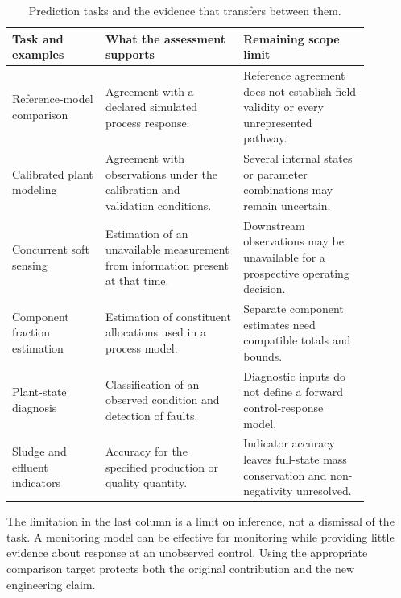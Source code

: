 \begin{table}[htbp]
\centering\footnotesize
\caption{Prediction tasks and the evidence that transfers between them.}
\label{tab:rrl_prediction_evidence}
\begin{tabular}{>{\raggedright\arraybackslash}p{0.23\linewidth}>{\raggedright\arraybackslash}p{0.34\linewidth}>{\raggedright\arraybackslash}p{0.31\linewidth}}
\toprule Task and examples & What the assessment supports & Remaining scope limit\\\midrule
Reference-model comparison\newline\citep{Calise2020,Henze2006} & Agreement with a declared simulated process response. & Reference agreement does not establish field validity or every unrepresented pathway.\\
Calibrated plant modeling\newline\citep{Meijer2004,SadriMoghaddam2021} & Agreement with observations under the calibration and validation conditions. & Several internal states or parameter combinations may remain uncertain.\\
Concurrent soft sensing\newline\citep{Ching2022} & Estimation of an unavailable measurement from information present at that time. & Downstream observations may be unavailable for a prospective operating decision.\\
Component fraction estimation\newline\citep{Wang2024} & Estimation of constituent allocations used in a process model. & Separate component estimates need compatible totals and bounds.\\
Plant-state diagnosis\newline\citep{Poch1993} & Classification of an observed condition and detection of faults. & Diagnostic inputs do not define a forward control-response model.\\
Sludge and effluent indicators\newline\citep{Ekinci2023,ManavDemir2024} & Accuracy for the specified production or quality quantity. & Indicator accuracy leaves full-state mass conservation and non-negativity unresolved.\\
\bottomrule
\end{tabular}
\end{table}

The limitation in the last column is a limit on inference, not a dismissal of the task. A monitoring model can be effective for monitoring while providing little evidence about response at an unobserved control. Using the appropriate comparison target protects both the original contribution and the new engineering claim.

